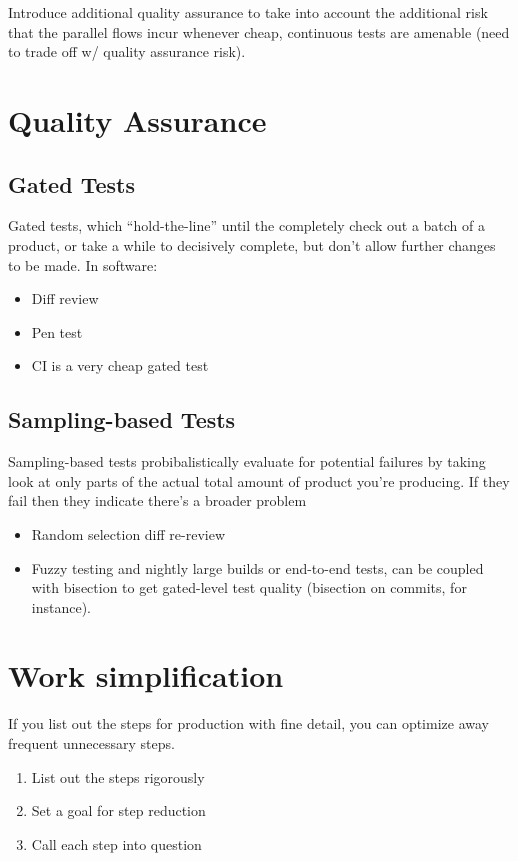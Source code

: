 \documentclass{article}
\begin{document}
Introduce additional quality assurance to take into account the additional risk that the parallel flows incur whenever cheap, continuous tests are amenable (need to trade off w/ quality assurance risk).

\section{Quality Assurance}

\subsection{Gated Tests}

Gated tests, which “hold-the-line” until the completely check out a batch of a product, or take a while to decisively complete, but don’t allow further changes to be made. In software:

\begin{itemize}
\item Diff review
\item Pen test
\item CI is a very cheap gated test
\end{itemize}

\subsection{Sampling-based Tests}

Sampling-based tests probibalistically evaluate for potential failures by taking look at only parts of the actual total amount of product you’re producing. If they fail then they indicate there’s a broader problem

\begin{itemize}
\item Random selection diff re-review
\item Fuzzy testing and nightly large builds or end-to-end tests, can be coupled with bisection to get gated-level test quality (bisection on commits, for instance).
\end{itemize}

\section{Work simplification}

If you list out the steps for production with fine detail, you can optimize away frequent unnecessary steps.

\begin{enumerate}
\item List out the steps rigorously
\item Set a goal for step reduction
\item Call each step into question
\end{enumerate}

{}

\end{document}

